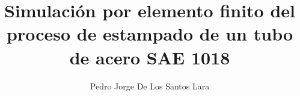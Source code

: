 \documentclass[12pt,letterpaper]{book}
\author{Pedro Jorge De Los Santos Lara}
\title{Simulación por elemento finito del proceso de estampado de un tubo de acero SAE 1018}
\begin{document}
\maketitle
%
\tableofcontents


\makeatletter
\def\thickhrulefill{\leavevmode \leaders \hrule height 1ex \hfill \kern \z@}
\def\@makechapterhead#1{%
  \reset@font
  \parindent \z@ 
  \vspace*{15\p@}%
  \hbox{%
    \vbox{\hsize=2cm
      \begin{tabular}{c}
        \scshape \strut \@chapapp{} \\
        \fbox{%
          \vrule depth 10em width 0pt%
          \vrule height 0pt depth 0pt width 2ex%
          {\Huge  \bfseries \strut  \thechapter}%
          \vrule height 0pt depth 0pt width 2ex%
          }
      \end{tabular}%
      }%
    \vbox{%
      \advance\hsize by -2cm
      \hrule\par
      \vskip 6pt%
      \hspace{1em}%
      \LARGE \bfseries #1
      }%
    }%
  \vskip 100\p@
}
\def\@makeschapterhead#1{%
  \reset@font
  \parindent \z@ 
  \vspace*{10\p@}%
 \hbox{%
    \vbox{\hsize=3cm
      \begin{tabular}{c}
        \scshape \strut \vphantom{\@chapapp{}} \hphantom{\@chapapp{}} \\
        \fbox{%
          \vrule depth 5em width 0pt%
          \vrule height 0pt depth 0pt width 1ex%
          {\LARGE \bfseries \strut \hphantom{\thechapter}}%
          \vrule height 10pt depth 0pt width 1ex%
          }
      \end{tabular}%
      }%
    \vbox{%
      \advance\hsize by -2cm    
      \hrule\par
      \vskip 8pt%
      \hspace{1em}%
      \LARGE \bfseries #1
      }%
    }%
  \vskip 100\p@
}






% 


\end{document}
